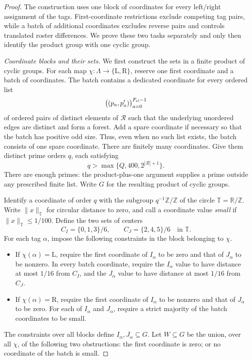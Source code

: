 \begin{proof}
The construction uses one block of coordinates for every left/right
assignment of the tags. First-coordinate restrictions exclude competing
tag pairs, while a batch of additional coordinates excludes reverse pairs
and controls translated roster differences. We prove these two tasks
separately and only then identify the product group with one cyclic group.

\emph{Coordinate blocks and their sets.}
We first construct the sets in a finite product of cyclic groups.  For each
map $\chi:\Lambda\to\{\mathrm L,\mathrm R\}$, reserve one first
coordinate and a batch of coordinates.  The batch contains a dedicated
coordinate for every ordered list
\[
 \bigl((p_a,p'_a)\bigr)_{a=0}^{F_{\rm cl}-1}
\]
of ordered pairs of distinct elements of $\mathcal R$ such that the
underlying unordered edges are distinct and form a forest.  Add a spare
coordinate if necessary so that the batch has positive odd size.  Thus, even
when no such list exists, the batch consists of one spare coordinate.
There are finitely many coordinates.  Give them distinct prime orders $q$,
each satisfying
\[
 q>\max\{Q,400,2^{|\mathcal R|+1}\}.
\]
There are enough primes: the product-plus-one argument supplies a prime
outside any prescribed finite list.  Write $G$ for the resulting product of
cyclic groups.

Identify a coordinate of order $q$ with the subgroup
$q^{-1}\mathbb Z/\mathbb Z$ of the circle
$\mathbb T=\mathbb R/\mathbb Z$.  Write $\|x\|_{\mathbb T}$ for circular
distance to zero, and call a coordinate value \emph{small} if
$\|x\|_{\mathbb T}\leq 1/100$.  Define the two sets of centers
\[
 C_I=\{0,1,3\}/6,
 \qquad C_J=\{2,4,5\}/6
 \quad\text{in }\mathbb T.
\]
For each tag $\alpha$, impose the following constraints in the block
belonging to $\chi$.
\begin{itemize}
\item If $\chi(\alpha)=\mathrm L$, require the first coordinate of
  $I_\alpha$ to be zero and that of $J_\alpha$ to be nonzero.  In every
  batch coordinate, require the $I_\alpha$ value to have distance at most
  $1/16$ from $C_I$, and the $J_\alpha$ value to have distance at most
  $1/16$ from $C_J$.
\item If $\chi(\alpha)=\mathrm R$, require the first coordinate of
  $I_\alpha$ to be nonzero and that of $J_\alpha$ to be zero.  For each of
  $I_\alpha$ and $J_\alpha$, require a strict majority of the batch
  coordinates to be small.
\end{itemize}
The constraints over all blocks define $I_\alpha,J_\alpha\subseteq G$.
Let $W\subseteq G$ be the union, over all $\chi$, of the following two
obstructions: the first coordinate is zero; or no coordinate of the batch
is small.


\end{proof}
